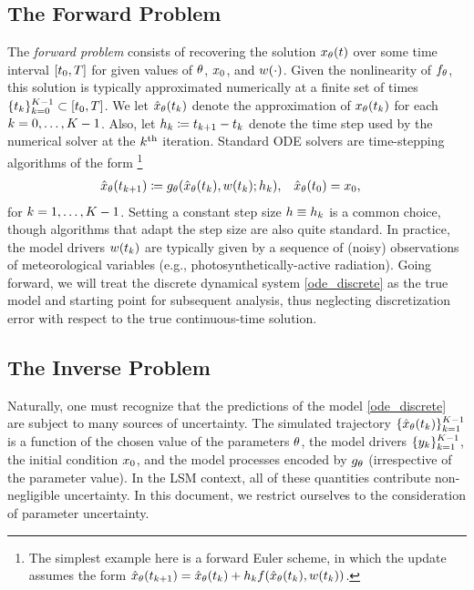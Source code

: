 \documentclass[12pt]{article}
\begin{document}
\subsection{The Forward Problem}
The \textit{forward problem} consists of recovering the solution $\state_{\Par}(\Time)$ over some time interval $[\timeInit, \timeEnd]$ for given 
values of $\Par$, $\stateInit$, and $\forcing(\cdot)$. Given the nonlinearity of $\funcODE_{\Par}$, this solution is typically approximated 
numerically at a finite set of times $\{\indexTime{\Time}\}_{\timeIdx=0}^{\Ntime-1} \subset [\timeInit, \timeEnd]$. We 
let $\stateApprox_{\Par}(\indexTime{\Time})$ denote the approximation of $\state_{\Par}(\indexTime{\Time})$ for each 
$\timeIdx = 0, \dots, \Ntime-1$. Also, let $\indexTime{\timeStep} \Def \indexTime[\timeIdx+1]{\Time} - \indexTime{\Time}$ denote the 
time step used by the numerical solver at the $\timeIdx^{\text{th}}$ iteration. Standard ODE solvers are time-stepping algorithms of the 
form 
\footnote{The simplest example here is a forward Euler scheme, in which the update assumes the form 
$\stateApprox_{\Par}(\indexTime[\timeIdx+1]{\Time})
= \stateApprox_{\Par}(\indexTime{\Time}) + \indexTime{\timeStep} \funcODE(\stateApprox_{\Par}(\indexTime{\Time}), \forcing(\indexTime{\Time}))$.}
\begin{align}
&\stateApprox_{\Par}(\indexTime[\timeIdx+1]{\Time}) \Def \fwdOne_{\Par}(\stateApprox_{\Par}(\indexTime{\Time}), \forcing(\indexTime{\Time}); \indexTime{\timeStep}), 
&&\stateApprox_{\Par}(\indexTime[0]{\Time}) = \stateInit, \label{ode_discrete}
\end{align}
for $\timeIdx = 1, \dots, \Ntime-1$. Setting a constant step size $\timeStep \equiv \indexTime{\timeStep}$ is a common choice, though 
algorithms that adapt the step size are also quite standard. In practice, the model drivers $\forcing(\indexTime{\Time})$
are typically given by a sequence of (noisy) observations of meteorological variables (e.g., photosynthetically-active radiation).
Going forward, we will treat the discrete dynamical system \ref{ode_discrete} as 
the true model and starting point for subsequent analysis, thus neglecting discretization error with respect to the true continuous-time solution. 

\subsection{The Inverse Problem}
Naturally, one must recognize that the predictions of the model \ref{ode_discrete} are subject to many sources of uncertainty. 
The simulated trajectory $\{\stateApprox_{\Par}(\indexTime{\Time})\}_{\timeIdx=1}^{\Ntime-1}$ is a function of  
the chosen value of the parameters $\Par$, the model drivers  $\{\indexTime{\obs}\}_{\timeIdx=1}^{\Ntime-1}$, the initial condition $\stateInit$, 
and the model processes encoded by $\fwdOne_{\Par}$ (irrespective of the parameter value). In the LSM context, 
all of these quantities contribute non-negligible uncertainty. 
In this document, we restrict ourselves to the consideration of parameter uncertainty. 
\end{document}
